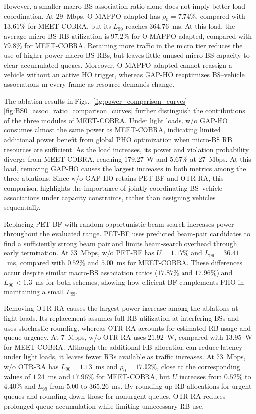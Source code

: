 \documentclass[10pt,journal,letterpaper]{journal_template/IEEEtran}
\newcommand{\rev}[1]{\textcolor{revisioncolor}{{}#1}}
\theoremstyle{remark}
\begin{document}
\rev{However, a smaller macro-BS association ratio alone does not imply better load coordination. At $29$~Mbps, O-MAPPO-adapted has $\rho_0=7.74\%$, compared with $13.61\%$ for MEET-COBRA, but its $L_{99}$ reaches $364.76$~ms. At this load, the average micro-BS RB utilization is $97.2\%$ for O-MAPPO-adapted, compared with $79.8\%$ for MEET-COBRA. Retaining more traffic in the micro tier reduces the use of higher-power macro-BS RBs, but leaves little unused micro-BS capacity to clear accumulated queues. Moreover, O-MAPPO-adapted cannot reassign a vehicle without an active HO trigger, whereas GAP-HO reoptimizes BS--vehicle associations in every frame as resource demands change.}

\rev{The ablation results in Figs.~\ref{fig:power_comparison_curves}--\ref{fig:BS0_assoc_ratio_comparison_curves} further distinguish the contributions of the three modules of MEET-COBRA. Under light loads, w/o GAP-HO consumes almost the same power as MEET-COBRA, indicating limited additional power benefit from global PHO optimization when micro-BS RB resources are sufficient. As the load increases, its power and violation probability diverge from MEET-COBRA, reaching $179.27$~W and $5.67\%$ at $27$~Mbps. At this load, removing GAP-HO causes the largest increases in both metrics among the three ablations. Since w/o GAP-HO retains PET-BF and OTR-RA, this comparison highlights the importance of jointly coordinating BS--vehicle associations under capacity constraints, rather than assigning vehicles sequentially.}

\rev{Replacing PET-BF with random opportunistic beam search increases power throughout the evaluated range. PET-BF uses predicted beam-pair candidates to find a sufficiently strong beam pair and limits beam-search overhead through early termination. At $33$~Mbps, w/o PET-BF has $U=1.17\%$ and $L_{99}=36.41$~ms, compared with $0.52\%$ and $5.00$~ms for MEET-COBRA. These differences occur despite similar macro-BS association ratios ($17.87\%$ and $17.96\%$) and $L_{90}<1.3$~ms for both schemes, showing how efficient BF complements PHO in maintaining a small $L_{99}$.}

\rev{Removing OTR-RA causes the largest power increase among the ablations at light loads. Its replacement assumes full RB utilization at interfering BSs and uses stochastic rounding, whereas OTR-RA accounts for estimated RB usage and queue urgency. At $7$~Mbps, w/o OTR-RA uses $21.92$~W, compared with $13.95$~W for MEET-COBRA. Although the additional RB allocation can reduce latency under light loads, it leaves fewer RBs available as traffic increases. At $33$~Mbps, w/o OTR-RA has $L_{90}=1.13$~ms and $\rho_0=17.02\%$, close to the corresponding values of $1.24$~ms and $17.96\%$ for MEET-COBRA, but $U$ increases from $0.52\%$ to $4.40\%$ and $L_{99}$ from $5.00$ to $365.26$~ms. By rounding up RB allocations for urgent queues and rounding down those for nonurgent queues, OTR-RA reduces prolonged queue accumulation while limiting unnecessary RB use.}
\end{document}
